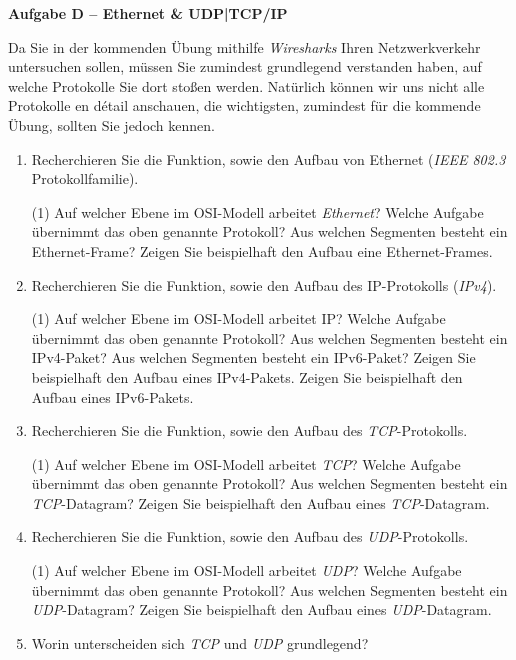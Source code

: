 \documentclass[paper=a4,fontsize=11pt]{scrartcl}%
\numberwithin{equation}{section}
\begin{document}
\begin{center}\Large{\textbf{Aufgabe D -- Ethernet \& UDP|TCP/IP}}\end{center}\vskip0.25in
Da Sie in der kommenden Übung mithilfe \emph{Wiresharks} Ihren Netzwerkverkehr untersuchen sollen, müssen Sie zumindest grundlegend verstanden haben, auf welche Protokolle Sie dort stoßen werden. Natürlich können wir uns nicht alle Protokolle en dé­tail anschauen, die wichtigsten, zumindest für die kommende Übung, sollten Sie jedoch kennen.
\begin{enumerate}
	\item Recherchieren Sie die Funktion, sowie den Aufbau von Ethernet (\emph{IEEE 802.3} Protokollfamilie).
	\begin{tasks}(1)
		\task Auf welcher Ebene im OSI-Modell arbeitet \emph{Ethernet}?
		\task Welche Aufgabe übernimmt das oben genannte Protokoll?
		\task Aus welchen Segmenten besteht ein Ethernet-Frame?
		\task Zeigen Sie beispielhaft den Aufbau eine Ethernet-Frames.
	\end{tasks}
	\item Recherchieren Sie die Funktion, sowie den Aufbau des IP-Protokolls (\emph{IPv4}).
	\begin{tasks}(1)
		\task Auf welcher Ebene im OSI-Modell arbeitet IP?
		\task Welche Aufgabe übernimmt das oben genannte Protokoll?
		\task Aus welchen Segmenten besteht ein IPv4-Paket?
		\task Aus welchen Segmenten besteht ein IPv6-Paket?
		\task Zeigen Sie beispielhaft den Aufbau eines IPv4-Pakets.
		\task Zeigen Sie beispielhaft den Aufbau eines IPv6-Pakets.
	\end{tasks}
	\item Recherchieren Sie die Funktion, sowie den Aufbau des \emph{TCP}-Protokolls.
	\begin{tasks}(1)
		\task Auf welcher Ebene im OSI-Modell arbeitet \emph{TCP}?
		\task Welche Aufgabe übernimmt das oben genannte Protokoll?
		\task Aus welchen Segmenten besteht ein \emph{TCP}-Datagram?
		\task Zeigen Sie beispielhaft den Aufbau eines \emph{TCP}-Datagram.
	\end{tasks}
	\item Recherchieren Sie die Funktion, sowie den Aufbau des \emph{UDP}-Protokolls.
	\begin{tasks}(1)
		\task Auf welcher Ebene im OSI-Modell arbeitet \emph{UDP}?
		\task Welche Aufgabe übernimmt das oben genannte Protokoll?
		\task Aus welchen Segmenten besteht ein \emph{UDP}-Datagram?
		\task Zeigen Sie beispielhaft den Aufbau eines \emph{UDP}-Datagram.
	\end{tasks}
	\item Worin unterscheiden sich \emph{TCP} und \emph{UDP} grundlegend?
\end{enumerate}
\end{document}
